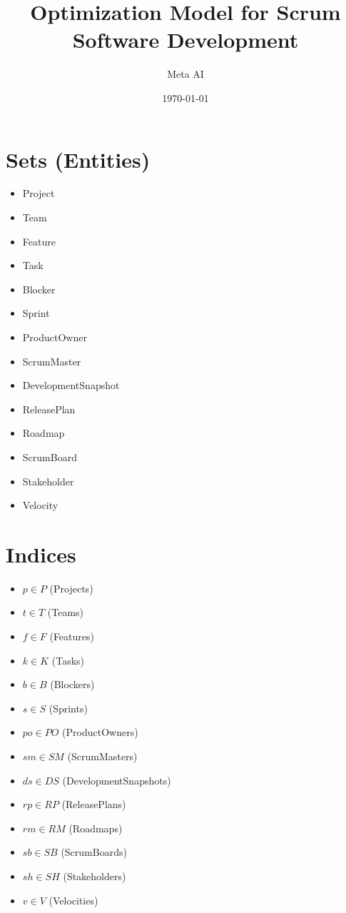 \documentclass{article}
\title{Optimization Model for Scrum Software Development}
\author{Meta AI}
\date{\today}
\begin{document}
\maketitle
\tableofcontents

\section{Sets (Entities)}
\begin{itemize}
    \item Project
    \item Team
    \item Feature
    \item Task
    \item Blocker
    \item Sprint
    \item ProductOwner
    \item ScrumMaster
    \item DevelopmentSnapshot
    \item ReleasePlan
    \item Roadmap
    \item ScrumBoard
    \item Stakeholder
    \item Velocity
\end{itemize}

\section{Indices}
\begin{itemize}
    \item $p \in P$ (Projects)
    \item $t \in T$ (Teams)
    \item $f \in F$ (Features)
    \item $k \in K$ (Tasks)
    \item $b \in B$ (Blockers)
    \item $s \in S$ (Sprints)
    \item $po \in PO$ (ProductOwners)
    \item $sm \in SM$ (ScrumMasters)
    \item $ds \in DS$ (DevelopmentSnapshots)
    \item $rp \in RP$ (ReleasePlans)
    \item $rm \in RM$ (Roadmaps)
    \item $sb \in SB$ (ScrumBoards)
    \item $sh \in SH$ (Stakeholders)
    \item $v \in V$ (Velocities)
\end{itemize}
\end{document}
